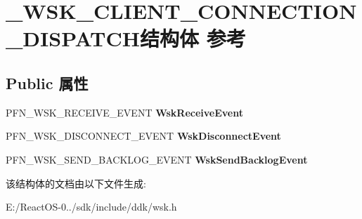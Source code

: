\hypertarget{struct___w_s_k___c_l_i_e_n_t___c_o_n_n_e_c_t_i_o_n___d_i_s_p_a_t_c_h}{}\section{\+\_\+\+W\+S\+K\+\_\+\+C\+L\+I\+E\+N\+T\+\_\+\+C\+O\+N\+N\+E\+C\+T\+I\+O\+N\+\_\+\+D\+I\+S\+P\+A\+T\+C\+H结构体 参考}
\label{struct___w_s_k___c_l_i_e_n_t___c_o_n_n_e_c_t_i_o_n___d_i_s_p_a_t_c_h}
\subsection*{Public 属性}
\begin{DoxyCompactItemize}
\item 
\mbox{\label{struct___w_s_k___c_l_i_e_n_t___c_o_n_n_e_c_t_i_o_n___d_i_s_p_a_t_c_h_ad17d3bc91a80dee18b8cf5bebd25984b}} 
P\+F\+N\+\_\+\+W\+S\+K\+\_\+\+R\+E\+C\+E\+I\+V\+E\+\_\+\+E\+V\+E\+NT {\bfseries Wsk\+Receive\+Event}
\item 
\mbox{\label{struct___w_s_k___c_l_i_e_n_t___c_o_n_n_e_c_t_i_o_n___d_i_s_p_a_t_c_h_a7ef750c1609e564650390922425e1e8f}} 
P\+F\+N\+\_\+\+W\+S\+K\+\_\+\+D\+I\+S\+C\+O\+N\+N\+E\+C\+T\+\_\+\+E\+V\+E\+NT {\bfseries Wsk\+Disconnect\+Event}
\item 
\mbox{\label{struct___w_s_k___c_l_i_e_n_t___c_o_n_n_e_c_t_i_o_n___d_i_s_p_a_t_c_h_ab891dc62f4301669b472eb2d98fd41be}} 
P\+F\+N\+\_\+\+W\+S\+K\+\_\+\+S\+E\+N\+D\+\_\+\+B\+A\+C\+K\+L\+O\+G\+\_\+\+E\+V\+E\+NT {\bfseries Wsk\+Send\+Backlog\+Event}
\end{DoxyCompactItemize}


该结构体的文档由以下文件生成\+:\begin{DoxyCompactItemize}
\item 
E\+:/\+React\+O\+S-\/0../sdk/include/ddk/wsk.\+h\end{DoxyCompactItemize}
